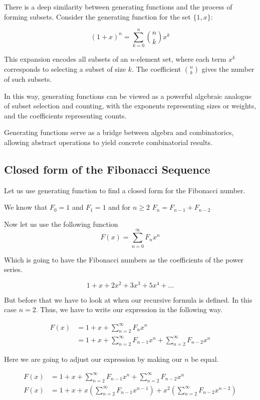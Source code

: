There is a deep similarity between generating functions and the process of forming subsets. Consider the 
generating function for the set \( \{1, x\} \):

\[
    {(1 + x)}^n = \sum_{k=0}^n \binom{n}{k} x^k
\]

This expansion encodes all subsets of an \(n\)-element set, where each term \( x^k \) corresponds to 
selecting a subset of size \(k\). The coefficient \( \binom{n}{k} \) gives the number of such subsets.

In this way, generating functions can be viewed as a powerful algebraic analogue of subset selection and 
counting, with the exponents representing sizes or weights, and the coefficients representing counts.

Generating functions serve as a bridge between algebra and combinatorics, allowing abstract operations to 
yield concrete combinatorial results.

\subsection{Closed form of the Fibonacci Sequence}

Let us use generating function to find a closed form for the Fibonacci number. 

We know that \(F_0 = 1\) and \(F_1 = 1\) and for \(n \ge 2\) \(F_n = F_{n-1} + F_{n-2}\)

Now let us use the following function
\[
    F(x) = \sum_{n = 0}^{\infty} F_n x^{n}
\]

Which is going to have the Fibonacci numbers as the coefficients of the power series.

\[
    1 + x + 2x^2 + 3x^3 + 5x^4 + \dots
\]

But before that we have to look at when our recursive formula is defined.
In this case \(n = 2\). Thus, we have to write our expression in the following way.

\begin{align*}
    F(x) &= 1 + x + \sum_{n = 2}^{\infty} F_n x^{n}\\
    &= 1 + x + \sum_{n = 2}^{\infty} F_{n -1} x^{n} + \sum_{n = 2}^{\infty} F_{n - 2}x^n 
\end{align*}

Here we are going to adjust our expression by making our \(n\) be equal.

\begin{align*}
    F(x) &= 1 + x + \sum_{n = 2}^{\infty} F_{n -1} x^{n} + \sum_{n = 2}^{\infty} F_{n - 2}x^n \\ 
    F(x) &= 1 + x + x \left( \sum_{n = 2}^{\infty} F_{n -1} x^{n-1}\right) + x^2 \left( \sum_{n = 2}^{\infty} F_{n -2} x^{n-2}\right)
\end{align*}


